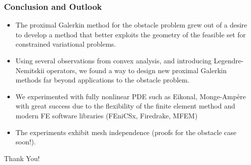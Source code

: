 \documentclass[aspectratio=169,xcolor=dvipsnames,11pt]{beamer}
\begin{document}
\begin{frame}
\begin{figure}
\end{figure}
\end{frame}



\begin{frame}\frametitle{Conclusion and Outlook}
\begin{itemize}
\item The proximal Galerkin method for the obstacle problem grew out of a desire to develop a method that better exploits the geometry of the feasible set for constrained variational problems.
\item \pause Using several observations from convex analysis, and introducing Legendre-Nemitskii operators, we found a way to design new proximal Galerkin methods far beyond applications to the obstacle problem.
\item \pause We experimented with fully nonlinear PDE such as Eikonal, Monge-Amp\`ere with great success due to the flexibility of the finite element method and modern FE software libraries (FEniCSx, Firedrake, MFEM)
\item \pause The experiments exhibit mesh independence (proofs for the obstacle case soon!).
\end{itemize}
\begin{center}
\Huge Thank You!
\end{center}
\end{frame}
\end{document}
